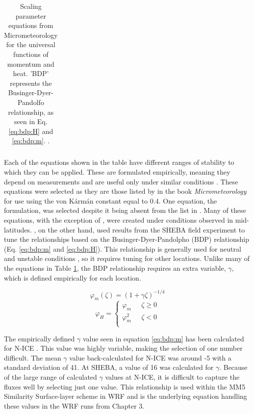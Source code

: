 {\begin{table}[p]
\begin{tabular}{| c | c |}
        \hline
    \end{tabular}
    \caption[Scaling parameter equations.]{Scaling parameter equations from Micrometeorology \citep{foken:2008} for the universal functions of momentum and heat. 'BDP' represents the Businger-Dyer-Pandolfo relationship, as seen in Eq. \ref{eq:bdp:H} and \ref{eq:bdp:m}. \citep{foken:2008}.}
    \label{tab:stability}
\end{table}}

Each of the equations shown in the table have different ranges of stability to which they can be applied. These are formulated empirically, meaning they depend on measurements and are useful only under similar conditions \citep{stull:1988, foken:2008}. These equations were selected as they are those listed by \citet{foken:2008} in the book \textit{Micrometeorology} for use using the von K\'{a}rm\'{a}n constant equal to 0.4. One equation, the \citet{andreas:2010} formulation, was selected despite it being absent from the list in \citet{foken:2008}. Many of these equations, with the exception of \citet{andreas:2010}, were created under conditions observed in mid-latitudes. \citet{andreas:2010}, on the other hand, used results from the SHEBA field experiment to tune the relationships based on the Businger-Dyer-Pandolpho (BDP) relationship (Eq. \ref{eq:bdp:m} and \ref{eq:bdp:H}). This relationship is generally used for neutral and unstable conditions \citep{foken:2008}, so it requires tuning for other locations. Unlike many of the equations in Table \ref{tab:stability}, the BDP relationship requires an extra variable, $\gamma$, which is defined empirically for each location.

\begin{equation}\label{eq:bdp:m}
\varphi_{m}(\zeta) = (1 + \gamma \zeta)^{-1/4}
\end{equation}
\begin{equation}\label{eq:bdp:H}
\varphi_{H} = \begin{cases} 
\varphi_{m} & \text{    } \zeta \geq 0 \\ 
\varphi_{m}^{2} & \text{    } \zeta < 0 \\ 
\end{cases}
\end{equation}

The empirically defined $\gamma$ value seen in equation \ref{eq:bdp:m} has been calculated for N-ICE \citep{paulson:1970, chen:2001}. This value was highly variable, making the selection of one number difficult. The mean $\gamma$ value back-calculated for N-ICE was around -5 with a standard deviation of 41. At SHEBA, a value of 16 was calculated for $\gamma$. Because of the large range of calculated $\gamma$ values at N-ICE, it is difficult to capture the fluxes well by selecting just one value. This relationship is used within the MM5 Similarity Surface-layer scheme in WRF \citep{paulson:1970} and is the underlying equation handling these values in the WRF runs from Chapter 3. 

